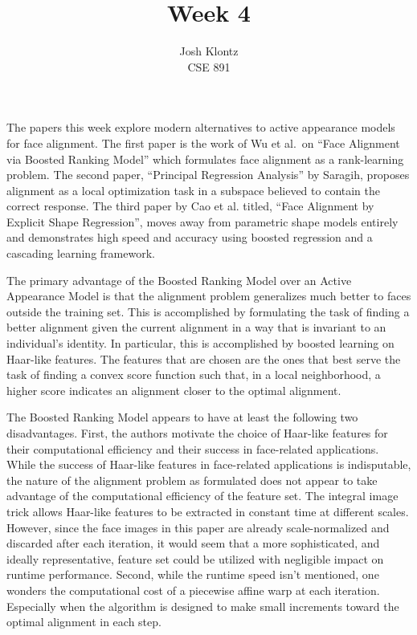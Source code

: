 \documentclass[12pt]{article}
\begin{document}
 
\title{Week 4}
\author{Josh Klontz\\CSE 891}
 
\maketitle
 
The papers this week explore modern alternatives to active appearance models for face alignment.
The first paper is the work of Wu et al.\ on ``Face Alignment via Boosted Ranking Model'' which formulates face alignment as a rank-learning problem.
The second paper, ``Principal Regression Analysis'' by Saragih, proposes alignment as a local optimization task in a subspace believed to contain the correct response.
The third paper by Cao et al. titled, ``Face Alignment by Explicit Shape Regression'', moves away from parametric shape models entirely and demonstrates high speed and accuracy using boosted regression and a cascading learning framework.
\par
The primary advantage of the Boosted Ranking Model over an Active Appearance Model is that the alignment problem generalizes much better to faces outside the training set.
This is accomplished by formulating the task of finding a better alignment given the current alignment in a way that is invariant to an individual's identity.
In particular, this is accomplished by boosted learning on Haar-like features.
The features that are chosen are the ones that best serve the task of finding a convex score function such that, in a local neighborhood, a higher score indicates an alignment closer to the optimal alignment.
\par
The Boosted Ranking Model appears to have at least the following two disadvantages. First, the authors motivate the choice of Haar-like features for their computational efficiency and their success in face-related applications. While the success of Haar-like features in face-related applications is indisputable, the nature of the alignment problem as formulated does not appear to take advantage of the computational efficiency of the feature set. The integral image trick allows Haar-like features to be extracted in constant time at different scales. However, since the face images in this paper are already scale-normalized and discarded after each iteration, it would seem that a more sophisticated, and ideally representative, feature set could be utilized with negligible impact on runtime performance. Second, while the runtime speed isn't mentioned, one wonders the computational cost of a piecewise affine warp at each iteration. Especially when the algorithm is designed to make small increments toward the optimal alignment in each step.
\end{document}
